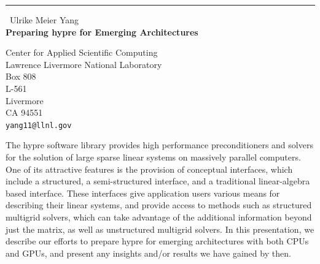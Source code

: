 \documentclass{report}
\begin{document}
\begin{center}
\rule{6in}{1pt} \
{\large Ulrike Meier Yang \\
{\bf Preparing hypre for Emerging Architectures}}

Center for Applied Scientific Computing \\ Lawrence Livermore National Laboratory \\ Box 808 \\ L-561 \\ Livermore \\ CA 94551
\\
{\tt yang11@llnl.gov}\end{center}

The hypre software library provides high performance preconditioners and
solvers for the solution of large sparse linear systems on massively
parallel computers. One of its attractive features is the provision of
conceptual interfaces, which include a structured, a semi-structured
interface, and a traditional linear-algebra based interface. These
interfaces give application users various means for describing their
linear systems, and provide access to methods such as structured
multigrid solvers, which can take advantage of the additional information
beyond just the matrix, as well as unstructured multigrid solvers. In
this presentation, we describe our efforts to prepare hypre for emerging
architectures with both CPUs and GPUs, and present any insights and/or
results we have gained by then.
\end{document}
